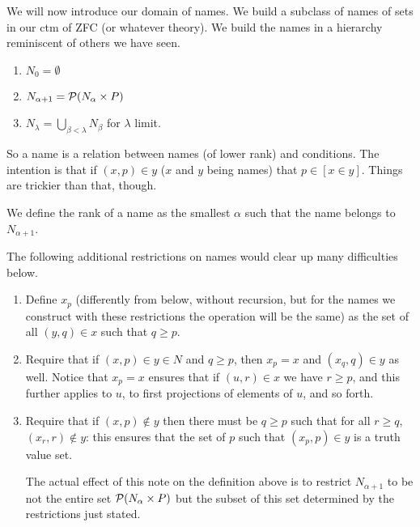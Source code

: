 \documentclass[12pt]{book}
\begin{document}
We will now introduce our domain of names.   We build a subclass of names of sets in our ctm of ZFC (or whatever theory).
We build the names in a hierarchy reminiscent of others we have seen.

\begin{enumerate}

\item $N_0 = \emptyset$

\item $N_{\alpha+1} = {\cal P}(N_{\alpha} \times P)$

\item $N_{\lambda}=\bigcup_{\beta<\lambda} N_{\beta}$ for $\lambda$ limit.

\end{enumerate}

So a name is a relation between names (of lower rank) and conditions.  The intention is that if $(x,p) \in y$ ($x$ and $y$ being names) that
$p \in [x \in y]$.  Things are trickier than that, though.

We define the rank of a name as the smallest $\alpha$ such that the name belongs to $N_{\alpha+1}$.


The following additional restrictions on names would clear up many difficulties below.

\begin{enumerate}

\item Define $x_p$ (differently from below, without recursion, but for the names we construct with these restrictions the operation will be the same) as the set of
all $(y,q) \in x$ such that $q \geq p$.

\item Require that if $(x,p) \in y \in N$ and $q \geq p$, then $x_p=x$ and $(x_q,q) \in y$ as well.  Notice that $x_p = x$ ensures that if $(u,r) \in x$ we have $r \geq p$, and this further applies to $u$, to first projections of elements of $u$, and so forth.

\item Require that if $(x,p) \not\in y$ then there must be $q \geq p$ such that for all $r\geq q$, $(x_r,r) \not\in y$:  this ensures that the set of $p$ such that
$(x_p,p) \in y$ is a truth value set.

The actual effect of this note on the definition above is to restrict $N_{\alpha+1}$ to be not the entire set ${\cal P}(N_{\alpha} \times P)$ but the subset of this set determined by the restrictions just stated.

\end{enumerate}
\end{document}
